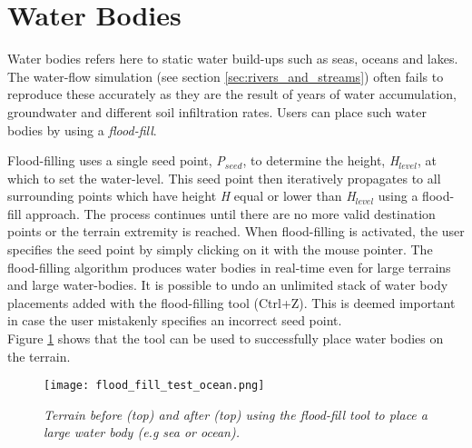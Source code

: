 \section{Water Bodies} \label{sec:water_bodies}

Water bodies refers here to static water build-ups such as seas, oceans and lakes. The water-flow simulation (see section \ref{sec:rivers_and_streams}) often fails to reproduce these accurately as they are the result of years of water accumulation, groundwater and different soil infiltration rates. Users can place such water bodies by using a \textit{flood-fill}.

Flood-filling uses a single seed point, \textit{P$_{seed}$}, to determine the height, \textit{H$_{level}$}, at which to set the water-level. This seed point then iteratively propagates to all surrounding points which have height \textit{H} equal or lower than \textit{H$_{level}$} using a flood-fill approach. The process continues until there are no more valid destination points or the terrain extremity is reached. When flood-filling is activated, the user specifies the seed point by simply clicking on it with the mouse pointer. The flood-filling algorithm produces water bodies in real-time even for large terrains and large water-bodies. It is possible to undo an unlimited stack of water body placements added with the flood-filling tool (Ctrl+Z). This is deemed important in case the user mistakenly specifies an incorrect seed point. \\

Figure \ref{fig:flood_fill_test} shows that the tool can be used to successfully place water bodies on the terrain.

\begin{figure}
\center
	\texttt{[image: flood\_fill\_test\_ocean.png]}
	\caption{ \textit{Terrain before (top) and after (top) using the flood-fill tool to place a large water body (e.g sea or ocean).} }	
	\label{fig:flood_fill_test}
\end{figure}
